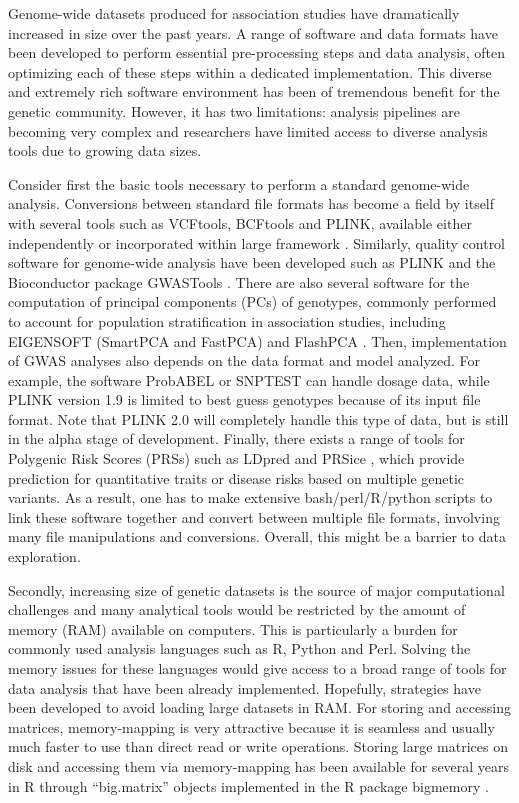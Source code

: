 \documentclass{bioinfo}
\begin{document}
Genome-wide datasets produced for association studies have dramatically increased in size over the past years. A range of software and data formats have been developed to perform essential pre-processing steps and data analysis, often optimizing each of these steps within a dedicated implementation. This diverse and extremely rich software environment has been of tremendous benefit for the genetic community. However, it has two limitations: analysis pipelines are becoming very complex and researchers have limited access to diverse analysis tools due to growing data sizes.

Consider first the basic tools necessary to perform a standard genome-wide analysis. Conversions between standard file formats has become a field by itself with several tools such as VCFtools, BCFtools and PLINK, available either independently or incorporated within large framework \cite[]{Danecek2011,Li2011,Purcell2007}. Similarly, quality control software for genome-wide analysis have been developed such as PLINK and the Bioconductor package GWASTools \cite[]{Gogarten2012}.
There are also several software for the computation of principal components (PCs) of genotypes, commonly performed to account for population stratification in association studies, including EIGENSOFT (SmartPCA and FastPCA) and FlashPCA \cite[]{Abraham2014a,Abraham2016a,Galinsky2016,Price2006}.
Then, implementation of GWAS analyses also depends on the data format and model analyzed. For example, the software ProbABEL \cite[]{Aulchenko2010} or SNPTEST \cite[]{Marchini2010} can handle dosage data, while PLINK version 1.9 is limited to best guess genotypes because of its input file format. Note that PLINK 2.0 will completely handle this type of data, but is still in the alpha stage of development. 
Finally, there exists a range of tools for Polygenic Risk Scores (PRSs) such as LDpred \cite[]{Vilhjalmsson2015} and PRSice \cite[]{Euesden2015}, which provide prediction for quantitative traits or disease risks based on multiple genetic variants. As a result, one has to make extensive bash/perl/R/python scripts to link these software together and convert between multiple file formats, involving many file manipulations and conversions. Overall, this might be a barrier to data exploration. 

Secondly, increasing size of genetic datasets is the source of major computational challenges and many analytical tools would be restricted by the amount of memory (RAM) available on computers. This is particularly a burden for commonly used analysis languages such as R, Python and Perl. Solving the memory issues for these languages would give access to a broad range of tools for data analysis that have been already implemented. Hopefully, strategies have been developed to avoid loading large datasets in RAM. For storing and accessing matrices, memory-mapping is very attractive because it is seamless and usually much faster to use than direct read or write operations. Storing large matrices on disk and accessing them via memory-mapping has been available for several years in R through ``big.matrix'' objects implemented in the R package bigmemory \cite[]{Kane2013}.
\end{document}
